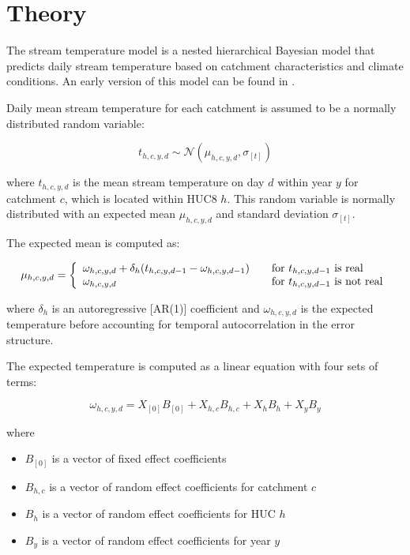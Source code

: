 \documentclass[
]{book}
\providecommand{\tightlist}{%
  \setlength{\itemsep}{0pt}\setlength{\parskip}{0pt}}
\begin{document}
\chapter{Theory}\label{theory}

The stream temperature model is a nested hierarchical Bayesian model that predicts daily stream temperature based on catchment characteristics and climate conditions. An early version of this model can be found in \citet{Letcher2016}.

Daily mean stream temperature for each catchment is assumed to be a normally distributed random variable:

\[t_{h,c,y,d} \sim \mathcal{N}(\mu_{h,c,y,d},\sigma_{[t]})\]

where \(t_{h,c,y,d}\) is the mean stream temperature on day \(d\) within year \(y\) for catchment \(c\), which is located within HUC8 \(h\). This random variable is normally distributed with an expected mean \(\mu_{h,c,y,d}\) and standard deviation \(\sigma_{[t]}\).

The expected mean is computed as:

\[
\mu_{h,c,y,d} = \left \{
  \begin{array}{l l}
    \omega_{h,c,y,d} + \delta_{h}(t_{h,c,y,d-1} - \omega_{h,c,y,d-1}) & \quad \text{for } t_{h,c,y,d-1} \text{ is real} \\
    \omega_{h,c,y,d} & \quad \text{for } t_{h,c,y,d-1} \text{ is not real}
  \end{array} \right.
\]

where \(\delta_h\) is an autoregressive {[}AR(1){]} coefficient and \(\omega_{h,c,y,d}\) is the expected temperature before accounting for temporal autocorrelation in the error structure.

The expected temperature is computed as a linear equation with four sets of terms:

\[\omega_{h,c,y,d} = X_{[0]} B_{[0]} + X_{h,c} B_{h,c} + X_{h} B_{h} + X_{y} B_{y}\]

where

\begin{itemize}
\tightlist
\item
  \(B_{[0]}\) is a vector of fixed effect coefficients
\item
  \(B_{h,c}\) is a vector of random effect coefficients for catchment \(c\)
\item
  \(B_{h}\) is a vector of random effect coefficients for HUC \(h\)
\item
  \(B_{y}\) is a vector of random effect coefficients for year \(y\)
\end{itemize}
\end{document}

